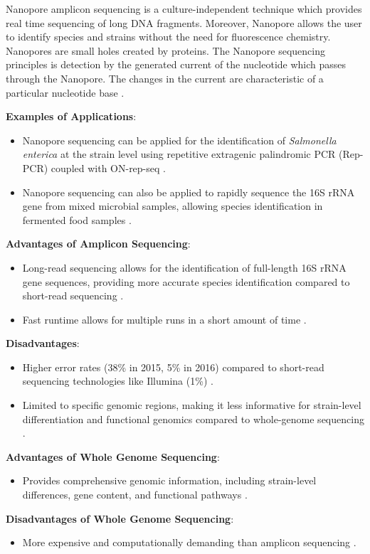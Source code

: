 Nanopore amplicon sequencing is a culture-independent technique which provides real time sequencing of long DNA fragments. Moreover, Nanopore allows the user to identify species and strains without the need for fluorescence chemistry. 
Nanopores are small holes created by proteins. The Nanopore sequencing principles is detection by the generated current of the nucleotide which passes through the Nanopore. The changes in the current are characteristic of a particular nucleotide base \cite*{LS10,L3-SeqBasedClass}.

\textbf{Examples of Applications}:
\begin{itemize}
    \item Nanopore sequencing can be applied for the identification of \textit{Salmonella enterica} at the strain level using repetitive extragenic palindromic PCR (Rep-PCR) coupled with ON-rep-seq \cite*{L5-DNAEnrichment}.
    \item Nanopore sequencing can also be applied to rapidly sequence the 16S rRNA gene from mixed microbial samples, allowing species identification in fermented food samples \cite*{L3-SeqBasedClass}.
\end{itemize}


\textbf{Advantages of Amplicon Sequencing}:

\begin{itemize}
    \item Long-read sequencing allows for the identification of full-length 16S rRNA gene sequences, providing more accurate species identification compared to short-read sequencing \cite*{LS10}.
    \item Fast runtime allows for multiple runs in a short amount of time \cite*{LS10}.
\end{itemize}

\textbf{Disadvantages}:
\begin{itemize}
    \item Higher error rates (38\% in 2015, 5\% in 2016) compared to short-read sequencing technologies like Illumina (1\%) \cite*{LS10}.
    \item Limited to specific genomic regions, making it less informative for strain-level differentiation and functional genomics compared to whole-genome sequencing \cite*{L5-DNAEnrichment}.
\end{itemize}

\textbf{Advantages of Whole Genome Sequencing}:
\begin{itemize}
    \item Provides comprehensive genomic information, including strain-level differences, gene content, and functional pathways \cite*{L5-DNAEnrichment}.
\end{itemize}

\textbf{Disadvantages of Whole Genome Sequencing}:
\begin{itemize}
    \item More expensive and computationally demanding than amplicon sequencing \cite*{L5-DNAEnrichment,L3-SeqBasedClass}.
\end{itemize}





